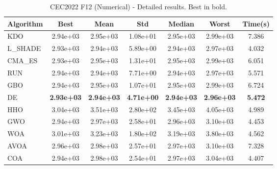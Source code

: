 \begin{table}[H]
\centering\small
\caption{CEC2022 F12 (Numerical) - Detailed results. Best in bold.}
\label{tab:cec2022_F12}
\begin{tabular}{lcccccc}
\toprule
\textbf{Algorithm} & \textbf{Best} & \textbf{Mean} & \textbf{Std} & \textbf{Median} & \textbf{Worst} & \textbf{Time(s)} \\
\midrule
KDO & 2.94e+03 & 2.95e+03 & 1.08e+01 & 2.95e+03 & 2.99e+03 & 7.386 \\
L_SHADE & 2.93e+03 & 2.94e+03 & 5.89e+00 & 2.94e+03 & 2.97e+03 & 4.032 \\
CMA_ES & 2.93e+03 & 2.95e+03 & 1.31e+01 & 2.95e+03 & 2.99e+03 & 6.051 \\
RUN & 2.94e+03 & 2.94e+03 & 7.71e+00 & 2.94e+03 & 2.97e+03 & 5.571 \\
GBO & 2.94e+03 & 2.95e+03 & 1.07e+01 & 2.95e+03 & 2.99e+03 & 6.724 \\
DE & \textbf{2.93e+03} & \textbf{2.94e+03} & \textbf{4.71e+00} & \textbf{2.94e+03} & \textbf{2.96e+03} & \textbf{5.472} \\
HHO & 3.04e+03 & 3.51e+03 & 2.80e+02 & 3.45e+03 & 4.05e+03 & 4.989 \\
GWO & 2.94e+03 & 2.97e+03 & 2.58e+01 & 2.96e+03 & 3.10e+03 & 4.453 \\
WOA & 3.01e+03 & 3.23e+03 & 1.80e+02 & 3.19e+03 & 3.80e+03 & 4.562 \\
AVOA & 2.96e+03 & 2.98e+03 & 2.57e+01 & 2.97e+03 & 3.10e+03 & 7.328 \\
COA & 2.94e+03 & 2.98e+03 & 2.54e+01 & 2.97e+03 & 3.04e+03 & 4.407 \\
\bottomrule
\end{tabular}
\end{table}
